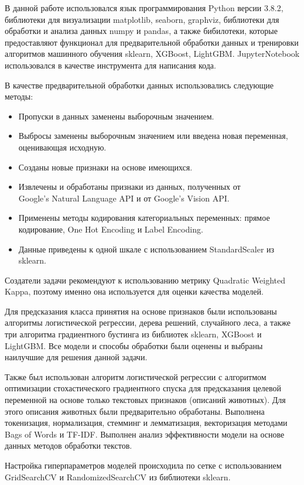 \documentclass[14pt]{mmcs_article}
\begin{document}
В данной работе использовался язык программирования Python версии 3.8.2, библиотеки для визуализации matplotlib, seaborn, graphviz, библиотеки для обработки и анализа данных numpy и pandas, а также бибилотеки, которые предоставляют функционал для предварительной обработки данных и тренировки алгоритмов машинного обучения sklearn, XGBoost, LightGBM. JupyterNotebook использовался в качестве инструмента для написания кода.

В качестве предварительной обработки данных использовались следующие методы: 
\begin{itemize}
	\item Пропуски в данных заменены выборочным значением.
	\item Выбросы заменены выборочным значением или введена новая переменная, оценивающая исходную.
	\item Созданы новые признаки на основе имеющихся.
	\item Извлечены и обработаны признаки из данных, полученных от \\ Google’s Natural Language API и от Google’s Vision API.
	\item Применены методы кодирования категориальных переменных: прямое кодирование, One Hot Encoding и Label Encoding.
	\item Данные приведены к одной шкале с использованием StandardScaler из sklearn.
\end{itemize}

Создатели задачи рекомендуют к использованию метрику Quadratic Weighted Kappa, поэтому именно она используется для оценки качества моделей.

Для предсказания класса принятия на основе признаков были использованы алгоритмы логистической регрессии, дерева решений, случайного леса, а также три алгоритма градиентного бустинга из библиотек sklearn, XGBoost и LightGBM. Все модели и способы обработки были оценены и выбраны наилучшие для решения данной задачи.

Также был использован алгоритм логистической регрессии с алгоритмом оптимизации стохастического градиентного спуска для предсказания целевой переменной на основе только текстовых признаков (описаний животных). Для этого описания животных были предварительно обработаны. Выполнена токенизация, нормализация, стемминг и лемматизация, векторизация методами Bags of Words и TF-IDF. Выполнен анализ эффективности модели на основе данных методов обработки текстов.

Настройка гиперпараметров моделей происходила по сетке с использованием GridSearchCV и RandomizedSearchCV из библиотеки sklearn.
\end{document}
